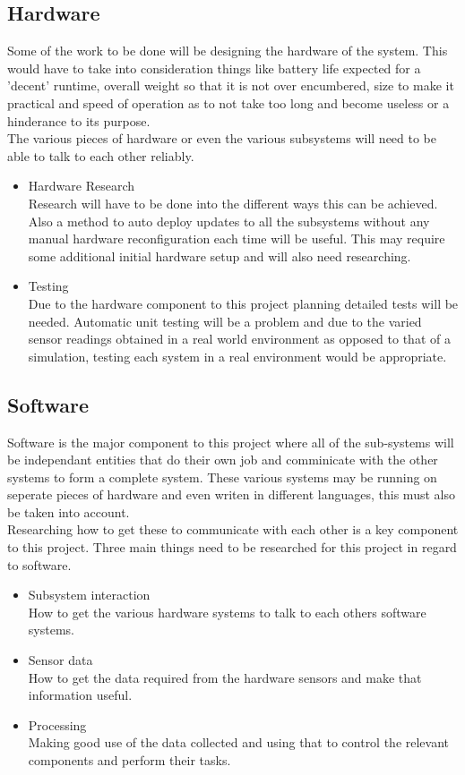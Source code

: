 \documentclass[11pt,fleqn,twoside]{article}
\begin{document}
\subsection{Hardware}
Some of the work to be done will be designing the hardware of the system.  This would have to take into consideration things like battery life expected for a 'decent' runtime, overall weight so that it is not over encumbered, size to make it practical and speed of operation as to not take too long and become useless or a hinderance to its purpose.
\\The various pieces of hardware or even the various subsystems will need to be able to talk to each other reliably.
\begin{itemize}
\item Hardware Research
\\Research will have to be done into the different ways this can be achieved.  Also a method to auto deploy updates to all the subsystems without any manual hardware reconfiguration each time will be useful.  This may require some additional initial hardware setup and will also need researching.
\item Testing
\\Due to the hardware component to this project planning detailed tests will be needed.  Automatic unit testing will be a problem and due to the varied sensor readings obtained in a real world environment as opposed to that of a simulation, testing each system in a real environment would be appropriate.
\end{itemize}
\subsection{Software}
Software is the major component to this project where all of the sub-systems will be independant entities that do their own job and comminicate with the other systems to form a complete system.  These various systems may be running on seperate pieces of hardware and even writen in different languages, this must also be taken into account.
\\Researching how to get these to communicate with each other is a key component to this project.  
Three main things need to be researched for this project in regard to software.
\begin{itemize}
\item Subsystem interaction
\\How to get the various hardware systems to talk to each others software systems.
\item Sensor data
\\How to get the data required from the hardware sensors and make that information useful.
\item Processing
\\Making good use of the data collected and using that to control the relevant components and perform their tasks.
\end{itemize}
\end{document}
